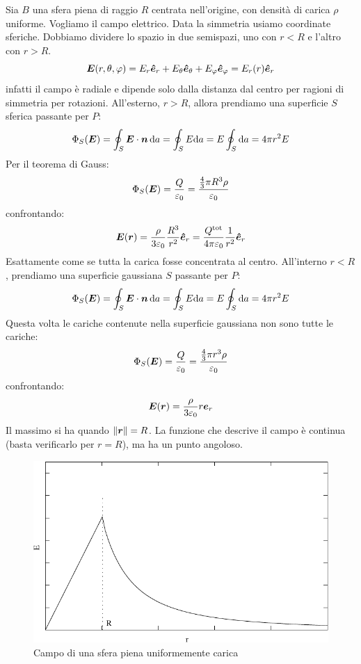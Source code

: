 \begin{Es}
Sia $B$ una sfera piena di raggio $R$ centrata nell'origine, con densità di carica $\rho$ uniforme. Vogliamo il campo elettrico. Data la simmetria usiamo coordinate sferiche. Dobbiamo dividere lo spazio in due semispazi, uno con $r<R$ e l'altro con $r>R$.
\begin{equation*}\boldsymbol{E}(r,\theta,\varphi)=E_r\boldsymbol{\hat {e}}_r+E_\theta\boldsymbol{\hat {e}}_\theta+E_\varphi \boldsymbol{\hat {e}}_\varphi=E_r(r)\boldsymbol{\hat {e}}_r\end{equation*}
infatti il campo è radiale e dipende solo dalla distanza dal centro per ragioni di simmetria per rotazioni.
All'esterno, $r>R$, allora prendiamo una superficie $S$ sferica passante per $P$:
\begin{equation*}\Phi_S(\boldsymbol{E})=\oint_S\boldsymbol{E}\cdot\boldsymbol{n}\,\mathrm{d} a=\oint_S E\mathrm{d} a=E\oint_S \mathrm{d} a=4\pi r^2 E\end{equation*}
Per il teorema di Gauss:
\begin{equation*}\Phi_S(\boldsymbol{E})=\frac{Q}{\varepsilon_0}=\frac{\frac{4}{3}\pi R^3\rho}{\varepsilon_0}\end{equation*}
confrontando:
\begin{equation*}\boldsymbol{E}(\boldsymbol{r})=\frac{\rho}{3\varepsilon_0}\frac{R^3}{r^2}\boldsymbol{\hat {e}}_r=\frac{Q^{\text{tot}}}{4\pi\varepsilon_0}\frac{1}{r^2}\boldsymbol{\hat {e}}_r\end{equation*}
Esattamente come se tutta la carica fosse concentrata al centro. All'interno $r<R$, prendiamo una superficie gaussiana $S$ passante per $P$:
\begin{equation*}\Phi_S(\boldsymbol{E})=\oint_S\boldsymbol{E}\cdot\boldsymbol{n}\,\mathrm{d} a=\oint_S E\mathrm{d} a=E\oint_S \mathrm{d} a=4\pi r^2 E\end{equation*}
Questa volta le cariche contenute nella superficie gaussiana non sono tutte le cariche:
\begin{equation*}\Phi_S(\boldsymbol{E})=\frac{Q}{\varepsilon_0}=\frac{\frac{4}{3}\pi r^3\rho}{\varepsilon_0}\end{equation*}
confrontando:
\begin{equation*}\boldsymbol{E}(\boldsymbol{r})=\frac{\rho}{3\varepsilon_0}r\boldsymbol{e}_r\end{equation*}
Il massimo si ha quando $\left\lVert\boldsymbol{r}\right\rVert=R$. La funzione che descrive il campo è continua (basta verificarlo per $r=R$), ma ha un punto angoloso.
\begin{figure}[htbp]
\centering
\includegraphics{immagini/fisica2/campo_sfera}
\caption{Campo di una sfera piena uniformemente carica}
\end{figure}
\end{Es}
